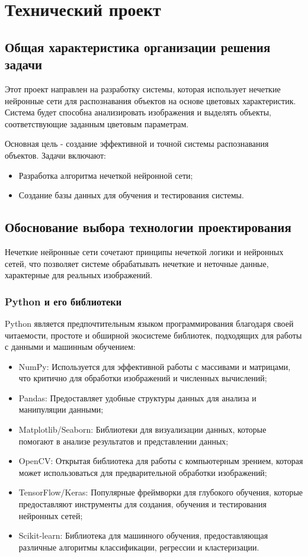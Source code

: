 \section{Технический проект}
\subsection{Общая характеристика организации решения задачи}

Этот проект направлен на разработку системы, которая использует нечеткие нейронные сети для распознавания объектов на основе цветовых характеристик. Система будет способна анализировать изображения и выделять объекты, соответствующие заданным цветовым параметрам.

Основная цель - создание эффективной и точной системы распознавания объектов. Задачи включают:

\begin{itemize}
\item Разработка алгоритма нечеткой нейронной сети;
\item Создание базы данных для обучения и тестирования системы.
\end{itemize}

\subsection{Обоснование выбора технологии проектирования}

Нечеткие нейронные сети сочетают принципы нечеткой логики и нейронных сетей, что позволяет системе обрабатывать нечеткие и неточные данные, характерные для реальных изображений.

\subsubsection{Python и его библиотеки}

Python является предпочтительным языком программирования благодаря своей читаемости, простоте и обширной экосистеме библиотек, подходящих для работы с данными и машинным обучением:

\begin{itemize}
\item NumPy: Используется для эффективной работы с массивами и матрицами, что критично для обработки изображений и численных вычислений;
\item Pandas: Предоставляет удобные структуры данных для анализа и манипуляции данными;
\item Matplotlib/Seaborn: Библиотеки для визуализации данных, которые помогают в анализе результатов и представлении данных;
\item OpenCV: Открытая библиотека для работы с компьютерным зрением, которая может использоваться для предварительной обработки изображений;
\item TensorFlow/Keras: Популярные фреймворки для глубокого обучения, которые предоставляют инструменты для создания, обучения и тестирования нейронных сетей;
\item Scikit-learn: Библиотека для машинного обучения, предоставляющая различные алгоритмы классификации, регрессии и кластеризации.
\end{itemize}


